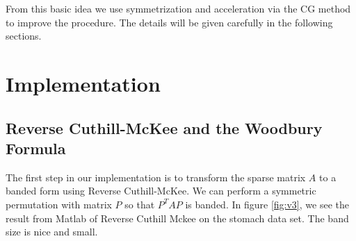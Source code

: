 \documentclass[a4paper,12pt]{article}
\begin{document}
From this basic idea we use symmetrization and acceleration via the CG method to improve the procedure. The details will be given carefully in the following sections.




\section{Implementation}



\subsection{Reverse Cuthill-McKee and the Woodbury Formula}
The first step in our implementation is to transform the sparse matrix $A$ to a banded form using Reverse Cuthill-McKee. We can perform a symmetric permutation with matrix $P$ so that $P^TAP$ is banded. In figure \ref{fig:v3}, we see the result from Matlab of Reverse Cuthill Mckee on the stomach data set. The band size is nice and small.

\end{document}
